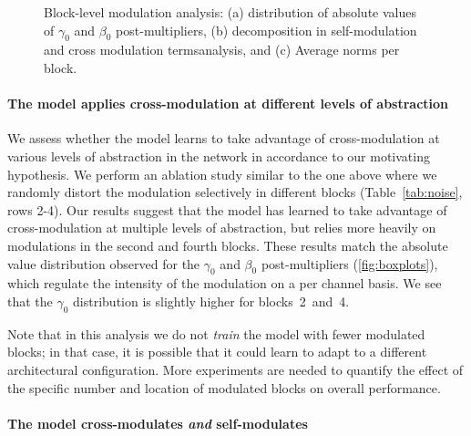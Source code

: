 \documentclass{article}
\begin{document}
\begin{figure}[t]
  \centering
  \hfill
  \hfill
  \caption{Block-level modulation analysis: (a) distribution of absolute values of $\gamma_0$ and
    $\beta_0$ post-multipliers, (b) decomposition in self-modulation and cross modulation termsanalysis,  and (c) Average norms per block.}
  \label{fig:boxplots}
\end{figure}


\paragraph{The model applies cross-modulation at different levels of abstraction}

We assess whether the model learns to take advantage of
cross-modulation at various levels of abstraction in the network in
accordance to our motivating hypothesis. We perform an ablation study
similar to the one above where we randomly distort the modulation
selectively in different blocks (Table~\ref{tab:noise}, rows 2-4). Our
results suggest that the model has learned to take advantage of
cross-modulation at multiple levels of abstraction, but relies more
heavily on modulations in the second and fourth blocks. These results
match the absolute value distribution observed for the $\gamma_0$ and
$\beta_0$ post-multipliers (\autoref{fig:boxplots}), which regulate
the intensity of the modulation on a per channel basis.  We see that
the $\gamma_0$ distribution is slightly higher for blocks~2~and~4.

Note that in this analysis we do not {\em train} the model with fewer modulated
blocks; in that case, it is possible that it could learn to adapt to a different
architectural configuration. More experiments are needed to quantify the effect
of the specific number and location of modulated blocks on overall performance.


\paragraph{The model cross-modulates {\em and} self-modulates}
\end{document}
